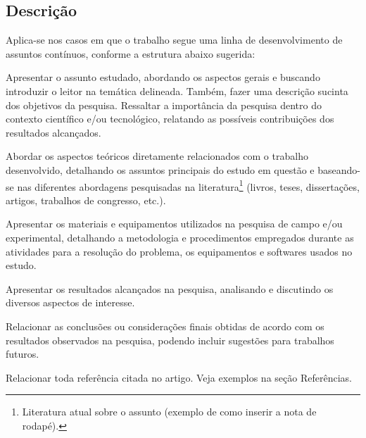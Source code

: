 
\subsection{Descrição}

Aplica-se nos casos em que o trabalho segue uma linha de desenvolvimento de assuntos contínuos, conforme a estrutura abaixo sugerida:

Apresentar o assunto estudado, abordando os aspectos gerais e buscando introduzir o leitor na temática delineada. Também, fazer uma descrição sucinta dos objetivos da pesquisa. Ressaltar a importância da pesquisa dentro do contexto científico e/ou tecnológico, relatando as possíveis contribuições dos resultados alcançados.

Abordar os aspectos teóricos diretamente relacionados com o trabalho desenvolvido, detalhando os assuntos principais do estudo em questão e baseando-se nas diferentes abordagens pesquisadas na literatura\footnote{Literatura atual sobre o assunto (exemplo de como inserir a nota de rodapé).} (livros, teses, dissertações, artigos, trabalhos de congresso, etc.).

Apresentar os materiais e equipamentos utilizados na pesquisa de campo e/ou experimental, detalhando a metodologia e procedimentos empregados durante as atividades para a resolução do problema, os equipamentos e softwares usados no estudo.

Apresentar os resultados alcançados na pesquisa, analisando e discutindo os diversos aspectos de interesse.

Relacionar as conclusões ou considerações finais obtidas de acordo com os resultados observados na pesquisa, podendo incluir sugestões para trabalhos futuros.

Relacionar toda referência citada no artigo. Veja exemplos na seção Referências.
